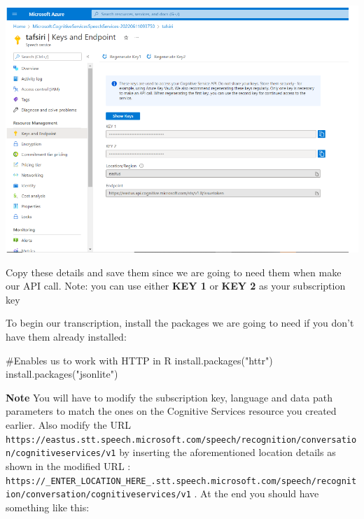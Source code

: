 \documentclass[
  letterpaper,
  DIV=11,
  numbers=noendperiod]{scrreprt}
\newenvironment{Shaded}{\begin{snugshade}}{\end{snugshade}}
\newcommand{\CommentTok}[1]{\textcolor[rgb]{0.37,0.37,0.37}{#1}}
\newcommand{\FunctionTok}[1]{\textcolor[rgb]{0.28,0.35,0.67}{#1}}
\newcommand{\NormalTok}[1]{\textcolor[rgb]{0.00,0.23,0.31}{#1}}
\newcommand{\StringTok}[1]{\textcolor[rgb]{0.13,0.47,0.30}{#1}}
\begin{document}
\includegraphics{./images/keys and endpoints.png}

Copy these details and save them since we are going to need them when
make our API call. Note: you can use either \textbf{KEY 1} or
\textbf{KEY 2} as your subscription key

To begin our transcription, install the packages we are going to need if
you don't have them already installed:

\begin{Shaded}
\begin{Highlighting}[]
\CommentTok{\#Enables us to work with HTTP in R}
\FunctionTok{install.packages}\NormalTok{(}\StringTok{"httr"}\NormalTok{) }
\FunctionTok{install.packages}\NormalTok{(}\StringTok{"jsonlite"}\NormalTok{)}
\end{Highlighting}
\end{Shaded}

\textbf{Note} You will have to modify the subscription key, language and
data path parameters to match the ones on the Cognitive Services
resource you created earlier. Also modify the URL
\texttt{\textquotesingle{}https://eastus.stt.speech.microsoft.com/speech/recognition/conversation/cognitiveservices/v1\textquotesingle{}}
by inserting the aforementioned location details as shown in the
modified URL :
\texttt{\textquotesingle{}https://\_ENTER\_LOCATION\_HERE\_.stt.speech.microsoft.com/speech/recognition/conversation/cognitiveservices/v1\textquotesingle{}}
. At the end you should have something like this:
\end{document}
